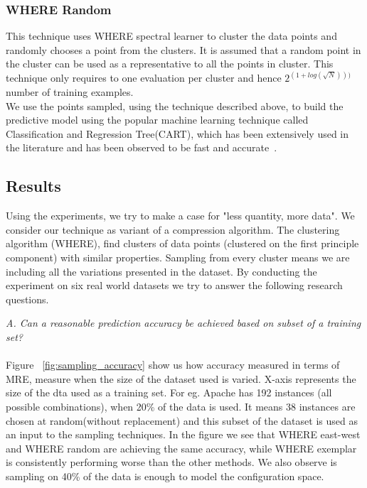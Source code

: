 \documentclass{sig-alternative}
\begin{document}
\subsubsection{WHERE Random}\label{where_random}
This technique uses WHERE spectral learner to cluster the data points and randomly chooses a point from the clusters. It is assumed that a random point in the cluster can be used as a representative to all the points in cluster. This technique only requires to one evaluation per cluster and hence $2^{(1+log(\sqrt{N})))}$ number of training examples.\\

We use the points sampled, using the technique described above, to build the predictive model using the popular machine learning technique called Classification and Regression Tree(CART), which has been extensively used in the literature and has been observed to be fast and accurate~\cite{guo2013variability}.

\subsection{Results}

Using the experiments, we try to make a case for "less quantity, more data". We consider our technique as variant of a compression algorithm. The clustering algorithm (WHERE), find clusters of data points (clustered on the first principle component) with similar properties. Sampling from every cluster means we are including all the variations presented in the dataset. 
By conducting the experiment on six real world datasets we try to answer the following research questions.

\textit{A. Can a reasonable prediction accuracy be achieved based on 
subset of a training set?}\\
\\
Figure ~\ref{fig:sampling_accuracy} show us how accuracy measured in terms of MRE, measure when the size of the dataset used is varied. X-axis represents the size of the dta used as a training set. For eg. Apache has 192 instances (all possible combinations), when 20\% of the data is used. It means 38 instances are chosen at random(without replacement) and this subset of the dataset is used as an input to the sampling techniques. In the figure we see that WHERE east-west and WHERE random are achieving the same accuracy, while WHERE exemplar is consistently performing worse than the other methods. We also observe is sampling on 40\% of the data is enough to model the configuration space. 
\end{document}
